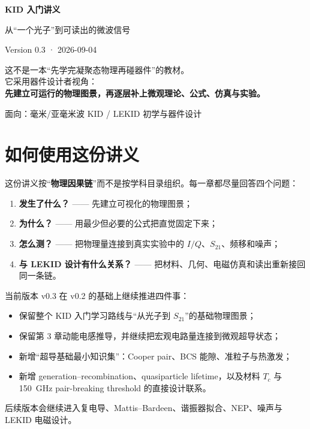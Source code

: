\documentclass[11pt,a4paper,openany]{ctexrep}
\newcommand{\Stwentyone}{S_{21}}
\begin{document}
\begin{titlepage}
\centering
\vspace*{2.2cm}
{\fontsize{30}{38}\selectfont\bfseries\color{KidDark} KID 入门讲义}\par
\vspace{0.5cm}
{\Large\color{KidBlue} 从“一个光子”到可读出的微波信号}\par
\vspace{1.4cm}
{\large Version 0.3 · 2026-09-04}\par
\vfill
\begin{tcolorbox}[width=0.88\textwidth,colback=KidGray,colframe=KidBlue!55,arc=3mm]
\centering
\large
这不是一本“先学完凝聚态物理再碰器件”的教材。\\[0.5em]
它采用器件设计者视角：\\[0.3em]
\textbf{先建立可运行的物理图景，再逐层补上微观理论、公式、仿真与实验。}
\end{tcolorbox}
\vfill
{\large 面向：毫米/亚毫米波 KID / LEKID 初学与器件设计}\par
\end{titlepage}

\tableofcontents
\clearpage

\chapter*{如何使用这份讲义}
这份讲义按“\textbf{物理因果链}”而不是按学科目录组织。每一章都尽量回答四个问题：
\begin{enumerate}
  \item \textbf{发生了什么？} —— 先建立可视化的物理图景；
  \item \textbf{为什么？} —— 用最少但必要的公式把直觉固定下来；
  \item \textbf{怎么测？} —— 把物理量连接到真实实验中的 $I/Q$、$\Stwentyone$、频移和噪声；
  \item \textbf{与 LEKID 设计有什么关系？} —— 把材料、几何、电磁仿真和读出重新接回同一条链。
\end{enumerate}

当前版本 v0.3 在 v0.2 的基础上继续推进四件事：
\begin{itemize}
  \item 保留整个 KID 入门学习路线与“从光子到 $\Stwentyone$”的基础物理图景；
  \item 保留第 3 章动能电感推导，并继续把宏观电路量连接到微观超导状态；
  \item 新增“超导基础最小知识集”：Cooper pair、BCS 能隙、准粒子与热激发；
  \item 新增 generation--recombination、quasiparticle lifetime，以及材料 $T_c$ 与 \SI{150}{GHz} pair-breaking threshold 的直接设计联系。
\end{itemize}
后续版本会继续进入复电导、Mattis--Bardeen、谐振器拟合、NEP、噪声与 LEKID 电磁设计。
\end{document}

